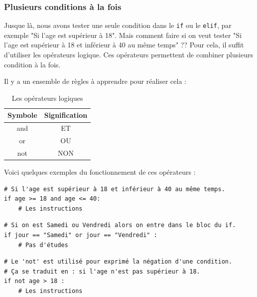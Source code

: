 \documentclass[12pt]{article}
\newcommand{\code}[1]{\colorbox{light-gray}{\texttt{#1}}}
\begin{document}
        \subsubsection{Plusieurs conditions à la fois}
            Jusque là, nous avons tester une seule condition dans le \code{if} ou le \code{elif}, par exemple "Si
            l'age est supérieur à 18". Mais comment faire si on veut tester "Si l'age est supérieur à 18 et
            inférieur à 40 au même temps" ??
            Pour cela, il suffit d'utiliser les opérateurs logique. Ces opérateurs permettent de combiner plusieurs
            condition à la fois.

            Il y a un ensemble de règles à apprendre pour réaliser cela :
            \begin{table}[H]
                \centering
                \begin{tabular}{|c|c|}
                    \hline
                    \textbf{Symbole} & \textbf{Signification} \\
                    \hline
                    and & ET \\
                    \hline
                    or & OU \\
                    \hline
                    not & NON \\
                    \hline
                \end{tabular}
                \caption{Les opérateurs logiques}
            \end{table}

            Voici quelques exemples du fonctionnement de ces opérateurs :
            \begin{lstlisting}[style=code]
# Si l'age est supérieur à 18 et inférieur à 40 au même temps.
if age >= 18 and age <= 40:
    # Les instructions
            \end{lstlisting}

            \begin{lstlisting}[style=code, breaklines=false]
# Si on est Samedi ou Vendredi alors on entre dans le bloc du if.
if jour == "Samedi" or jour == "Vendredi" :
    # Pas d'études
            \end{lstlisting}

            \begin{lstlisting}[style=code]
# Le 'not' est utilisé pour exprimé la négation d'une condition.
# Ça se traduit en : si l'age n'est pas supérieur à 18.
if not age > 18 :
    # Les instructions
            \end{lstlisting}
\end{document}
